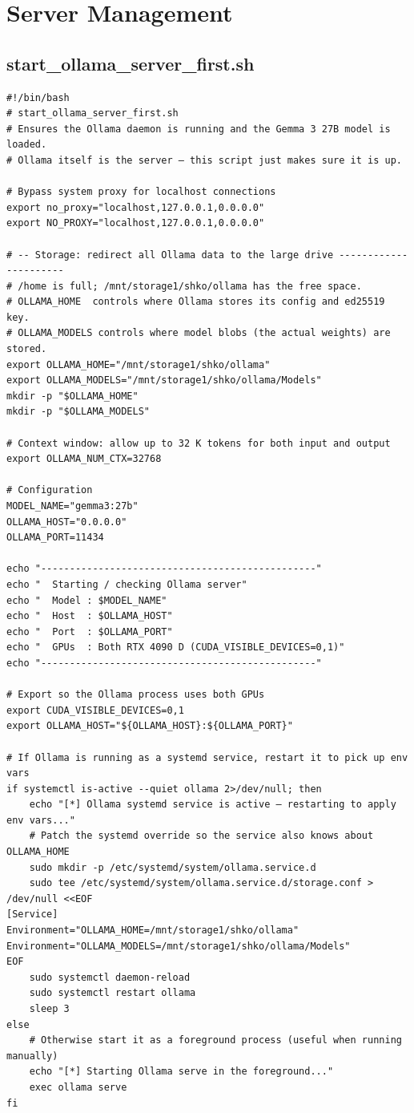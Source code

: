 \documentclass[11pt]{article}
\begin{document}
\newpage
\section{Server Management}

\subsection{start\_ollama\_server\_first.sh}
\begin{lstlisting}[style=bashstyle, caption={start\_ollama\_server\_first.sh}]
#!/bin/bash
# start_ollama_server_first.sh
# Ensures the Ollama daemon is running and the Gemma 3 27B model is loaded.
# Ollama itself is the server — this script just makes sure it is up.

# Bypass system proxy for localhost connections
export no_proxy="localhost,127.0.0.1,0.0.0.0"
export NO_PROXY="localhost,127.0.0.1,0.0.0.0"

# -- Storage: redirect all Ollama data to the large drive ----------------------
# /home is full; /mnt/storage1/shko/ollama has the free space.
# OLLAMA_HOME  controls where Ollama stores its config and ed25519 key.
# OLLAMA_MODELS controls where model blobs (the actual weights) are stored.
export OLLAMA_HOME="/mnt/storage1/shko/ollama"
export OLLAMA_MODELS="/mnt/storage1/shko/ollama/Models"
mkdir -p "$OLLAMA_HOME"
mkdir -p "$OLLAMA_MODELS"

# Context window: allow up to 32 K tokens for both input and output
export OLLAMA_NUM_CTX=32768

# Configuration
MODEL_NAME="gemma3:27b"
OLLAMA_HOST="0.0.0.0"
OLLAMA_PORT=11434

echo "------------------------------------------------"
echo "  Starting / checking Ollama server"
echo "  Model : $MODEL_NAME"
echo "  Host  : $OLLAMA_HOST"
echo "  Port  : $OLLAMA_PORT"
echo "  GPUs  : Both RTX 4090 D (CUDA_VISIBLE_DEVICES=0,1)"
echo "------------------------------------------------"

# Export so the Ollama process uses both GPUs
export CUDA_VISIBLE_DEVICES=0,1
export OLLAMA_HOST="${OLLAMA_HOST}:${OLLAMA_PORT}"

# If Ollama is running as a systemd service, restart it to pick up env vars
if systemctl is-active --quiet ollama 2>/dev/null; then
    echo "[*] Ollama systemd service is active — restarting to apply env vars..."
    # Patch the systemd override so the service also knows about OLLAMA_HOME
    sudo mkdir -p /etc/systemd/system/ollama.service.d
    sudo tee /etc/systemd/system/ollama.service.d/storage.conf > /dev/null <<EOF
[Service]
Environment="OLLAMA_HOME=/mnt/storage1/shko/ollama"
Environment="OLLAMA_MODELS=/mnt/storage1/shko/ollama/Models"
EOF
    sudo systemctl daemon-reload
    sudo systemctl restart ollama
    sleep 3
else
    # Otherwise start it as a foreground process (useful when running manually)
    echo "[*] Starting Ollama serve in the foreground..."
    exec ollama serve
fi


\end{lstlisting}
\end{document}
